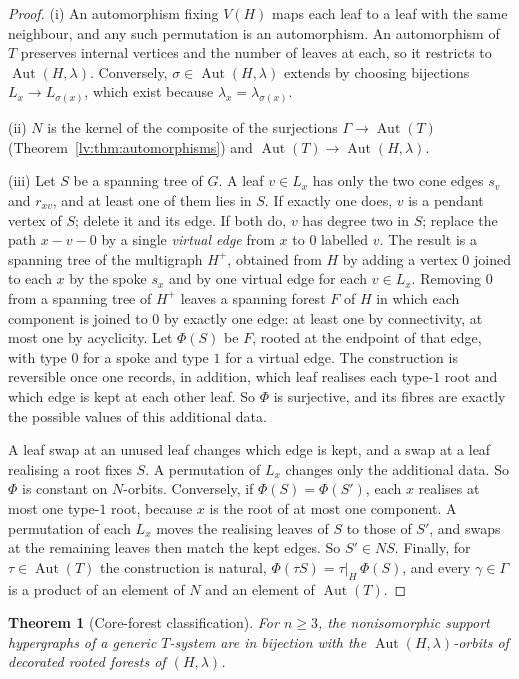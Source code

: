 \documentclass[11pt,a4paper]{article}
\newtheorem{theorem}{Theorem}[section]
\theoremstyle{definition}
\theoremstyle{remark}
\newcommand{\Aut}{\operatorname{Aut}}
\begin{document}
\begin{proof}
(i) An automorphism fixing $V(H)$ maps each leaf to a leaf with the same neighbour, and any such permutation is an automorphism. An automorphism of $T$ preserves internal vertices and the number of leaves at each, so it restricts to $\Aut(H,\lambda)$. Conversely, $\sigma\in\Aut(H,\lambda)$ extends by choosing bijections $L_x\to L_{\sigma(x)}$, which exist because $\lambda_x=\lambda_{\sigma(x)}$.

(ii) $N$ is the kernel of the composite of the surjections $\Gamma\to\Aut(T)$ (Theorem~\ref{lv:thm:automorphisms}) and $\Aut(T)\to\Aut(H,\lambda)$.

(iii) Let $S$ be a spanning tree of $G$. A leaf $v\in L_x$ has only the two cone edges $s_v$ and $r_{xv}$, and at least one of them lies in $S$. If exactly one does, $v$ is a pendant vertex of $S$; delete it and its edge. If both do, $v$ has degree two in $S$; replace the path $x-v-0$ by a single \emph{virtual edge} from $x$ to $0$ labelled $v$. The result is a spanning tree of the multigraph $H^+$, obtained from $H$ by adding a vertex $0$ joined to each $x$ by the spoke $s_x$ and by one virtual edge for each $v\in L_x$. Removing $0$ from a spanning tree of $H^+$ leaves a spanning forest $F$ of $H$ in which each component is joined to $0$ by exactly one edge: at least one by connectivity, at most one by acyclicity. Let $\Phi(S)$ be $F$, rooted at the endpoint of that edge, with type $0$ for a spoke and type $1$ for a virtual edge. The construction is reversible once one records, in addition, which leaf realises each type-$1$ root and which edge is kept at each other leaf. So $\Phi$ is surjective, and its fibres are exactly the possible values of this additional data.

A leaf swap at an unused leaf changes which edge is kept, and a swap at a leaf realising a root fixes $S$. A permutation of $L_x$ changes only the additional data. So $\Phi$ is constant on $N$-orbits. Conversely, if $\Phi(S)=\Phi(S')$, each $x$ realises at most one type-$1$ root, because $x$ is the root of at most one component. A permutation of each $L_x$ moves the realising leaves of $S$ to those of $S'$, and swaps at the remaining leaves then match the kept edges. So $S'\in NS$. Finally, for $\tau\in\Aut(T)$ the construction is natural, $\Phi(\tau S)=\tau|_H\,\Phi(S)$, and every $\gamma\in\Gamma$ is a product of an element of $N$ and an element of $\Aut(T)$.
\end{proof}

\begin{theorem}[Core-forest classification]
\label{lv:thm:core}
For $n\geq3$, the nonisomorphic support hypergraphs of a generic $T$-system are in bijection with the $\Aut(H,\lambda)$-orbits of decorated rooted forests of $(H,\lambda)$.
\end{theorem}
\end{document}

